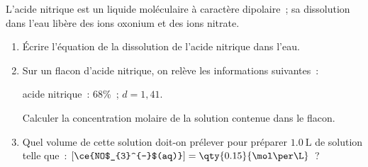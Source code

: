 L'acide nitrique  est un liquide moléculaire à caractère dipolaire~; sa
dissolution dans l'eau libère des ions oxonium et des ions nitrate.
\begin{enumerate}
    \item Écrire l'équation de la dissolution de l'acide nitrique dans l'eau.
    \item Sur un flacon d'acide nitrique, on relève les informations suivantes~:
          \begin{center}
              acide nitrique~:  68\%~; $d=1,41$.
          \end{center}

          Calculer la concentration molaire de la solution contenue dans le
          flacon.
    \item Quel volume de cette solution doit-on prélever pour préparer
          $\qty{1.0}{\L}$ de solution telle que~:
          $[\ce{NO$_{3}^{-}$(aq)}]=\qty{0.15}{\mol\per\L}$~?

\end{enumerate}

